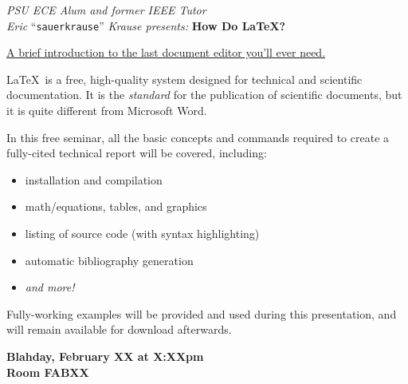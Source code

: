 \documentclass{article}
\begin{document}
    \begin{center} \LARGE
        \vspace*{.5in}
        \textit{PSU ECE Alum and former IEEE Tutor}\\
        \textit{Eric} ``\texttt{sauerkrause}'' \textit{Krause presents:} \vspace{.45in}
        {\Huge \bf How Do \LaTeX?}\\\vspace{.35in}
    
        \LARGE\underline{A brief introduction to the last document editor you'll ever need.}\vspace{.2in}
    \end{center}

    \Large\LaTeX\ is a  free, high-quality system designed for technical and scientific documentation. It is the \emph{standard} for the publication of scientific documents, but it is quite different from Microsoft Word.\vspace{.2in}

    In this free seminar, all the basic concepts and commands required to create a fully-cited technical report will be covered, including:
    \begin{itemize}
        \item installation and compilation
        \item math/equations, tables, and graphics
        \item listing of source code (with syntax highlighting)
        \item automatic bibliography generation
        \item \emph{and more!}
    \end{itemize}\vspace{.2in}

    Fully-working examples will be provided and used during this presentation, and will remain available for download afterwards. 
  
    \begin{center} \Huge
        \textbf{Blahday, February XX at X:XXpm\\Room FABXX}
    \end{center}
\end{document}
